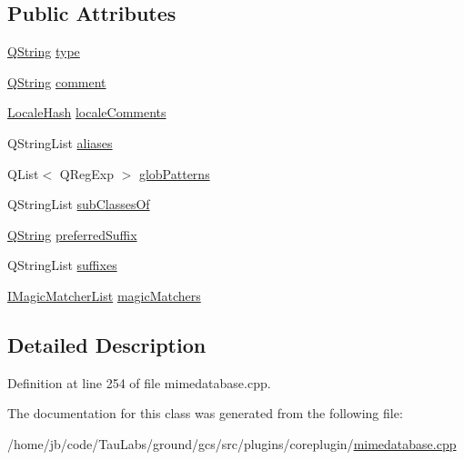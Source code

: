 \subsection*{\-Public \-Attributes}
\begin{DoxyCompactItemize}
\item 
\hyperlink{group___u_a_v_objects_plugin_gab9d252f49c333c94a72f97ce3105a32d}{\-Q\-String} \hyperlink{group___core_plugin_ga7dbb8f6515ba35d7085128e34d73780e}{type}
\item 
\hyperlink{group___u_a_v_objects_plugin_gab9d252f49c333c94a72f97ce3105a32d}{\-Q\-String} \hyperlink{group___core_plugin_ga251b5ca21fe2345ccbc33cf8ee61497f}{comment}
\item 
\hyperlink{group___core_plugin_gabaf932c31842b2da7fc0e9821b5411dd}{\-Locale\-Hash} \hyperlink{group___core_plugin_gada0e5093133c4b18896aba408f438e01}{locale\-Comments}
\item 
\-Q\-String\-List \hyperlink{group___core_plugin_ga496a24d7c95aca273872b4731ad4979e}{aliases}
\item 
\-Q\-List$<$ \-Q\-Reg\-Exp $>$ \hyperlink{group___core_plugin_ga04e9a24f7770cb063fcd46fa119e74e6}{glob\-Patterns}
\item 
\-Q\-String\-List \hyperlink{group___core_plugin_ga708168392cf9284c5b2a3732164c46bd}{sub\-Classes\-Of}
\item 
\hyperlink{group___u_a_v_objects_plugin_gab9d252f49c333c94a72f97ce3105a32d}{\-Q\-String} \hyperlink{group___core_plugin_gaafa45c85eece3a688d455cb2307626e7}{preferred\-Suffix}
\item 
\-Q\-String\-List \hyperlink{group___core_plugin_ga90349fbad7bef53d58473cb727d1eaee}{suffixes}
\item 
\hyperlink{group___core_plugin_ga01712cfcc6b7a1dd9c6a1163064fc3d6}{\-I\-Magic\-Matcher\-List} \hyperlink{group___core_plugin_ga36c49a606b4d45c846cf1d188f00432f}{magic\-Matchers}
\end{DoxyCompactItemize}


\subsection{\-Detailed \-Description}


\-Definition at line 254 of file mimedatabase.\-cpp.



\-The documentation for this class was generated from the following file\-:\begin{DoxyCompactItemize}
\item 
/home/jb/code/\-Tau\-Labs/ground/gcs/src/plugins/coreplugin/\hyperlink{mimedatabase_8cpp}{mimedatabase.\-cpp}\end{DoxyCompactItemize}
